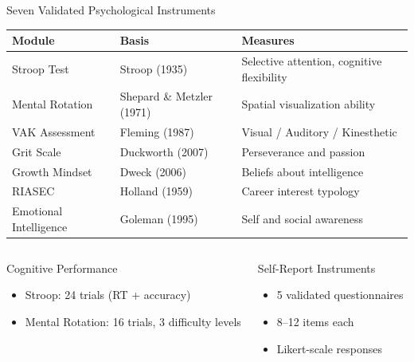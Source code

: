 \documentclass[aspectratio=169,11pt,xcolor=dvipsnames]{beamer}
\begin{document}
\begin{frame}{Seven Validated Psychological Instruments}

\begin{table}
\centering
\small
\begin{tabular}{@{}lll@{}}
\toprule
\textbf{Module} & \textbf{Basis} & \textbf{Measures} \\
\midrule

Stroop Test & Stroop (1935) & Selective attention, cognitive flexibility \\
Mental Rotation & Shepard \& Metzler (1971) & Spatial visualization ability \\

VAK Assessment & Fleming (1987) & Visual / Auditory / Kinesthetic \\
Grit Scale & Duckworth (2007) & Perseverance and passion \\

Growth Mindset & Dweck (2006) & Beliefs about intelligence \\
RIASEC & Holland (1959) & Career interest typology \\

Emotional Intelligence & Goleman (1995) & Self and social awareness \\
\bottomrule
\end{tabular}
\end{table}

\vspace{0.5em}

\begin{columns}[T]
\begin{block}{Cognitive Performance}
\begin{itemize}
    \item Stroop: 24 trials (RT + accuracy)
    \item Mental Rotation: 16 trials, 3 difficulty levels
\end{itemize}
\end{block}

\begin{block}{Self-Report Instruments}
\begin{itemize}
    \item 5 validated questionnaires
    \item 8--12 items each
    \item Likert-scale responses
\end{itemize}
\end{block}
\end{columns}

\end{frame}
\end{document}
